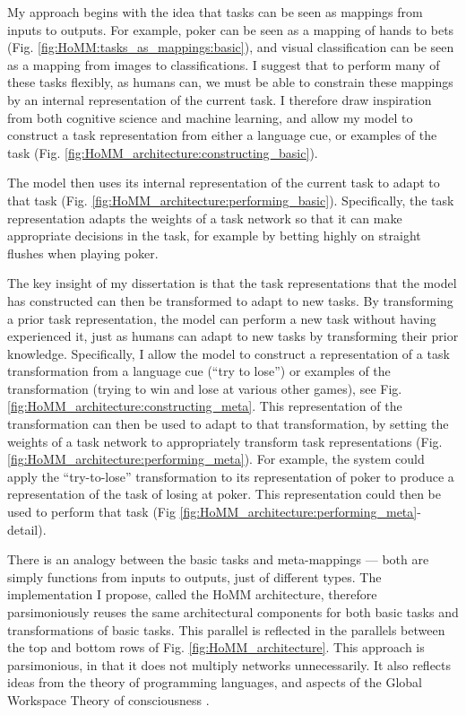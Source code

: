 \documentclass[12pt]{article}
\begin{document}
My approach begins with the idea that tasks can be seen as mappings from inputs to outputs. For example, poker can be seen as a mapping of hands to bets (Fig. \ref{fig:HoMM:tasks_as_mappings:basic}), and visual classification can be seen as a mapping from images to classifications. I suggest that to perform many of these tasks flexibly, as humans can, we must be able to constrain these mappings by an internal representation of the current task. I therefore draw inspiration from both cognitive science and machine learning, and allow my model to construct a task representation from either a language cue, or examples of the task (Fig. \ref{fig:HoMM_architecture:constructing_basic}). 

The model then uses its internal representation of the current task to adapt to that task (Fig. \ref{fig:HoMM_architecture:performing_basic}). Specifically, the task representation adapts the weights of a task network so that it can make appropriate decisions in the task, for example by betting highly on straight flushes when playing poker. 

The key insight of my dissertation is that the task representations that the model has constructed can then be transformed to adapt to new tasks. By transforming a prior task representation, the model can perform a new task without having experienced it, just as humans can adapt to new tasks by transforming their prior knowledge. Specifically, I allow the model to construct a representation of a task transformation from a language cue (``try to lose'') or examples of the transformation (trying to win and lose at various other games), see Fig. \ref{fig:HoMM_architecture:constructing_meta}. This representation of the transformation can then be used to adapt to that transformation, by setting the weights of a task network to appropriately transform task representations (Fig. \ref{fig:HoMM_architecture:performing_meta}). For example, the system could apply the ``try-to-lose'' transformation to its representation of poker to produce a representation of the task of losing at poker. This representation could then be used to perform that task (Fig \ref{fig:HoMM_architecture:performing_meta}-detail). 

There is an analogy between the basic tasks and meta-mappings --- both are simply functions from inputs to outputs, just of different types. The implementation I propose, called the HoMM architecture, therefore parsimoniously reuses the same architectural components for both basic tasks and transformations of basic tasks. This parallel is reflected in the parallels between the top and bottom rows of Fig. \ref{fig:HoMM_architecture}. This approach is parsimonious, in that it does not multiply networks unnecessarily. It also reflects ideas from the theory of programming languages, and aspects of the Global Workspace Theory of consciousness \citep{Baars2005}. 
\end{document}
